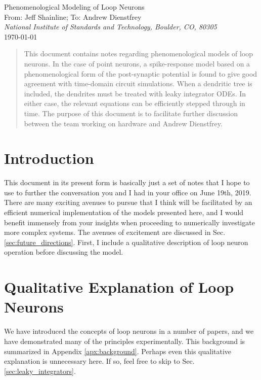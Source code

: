 \documentclass[]{article}
\begin{document}
    
\begin{center}
\LARGE{Phenomenological Modeling of Loop Neurons}\\ 
\vspace{0.3em}
\large From: Jeff Shainline; To: Andrew Dienstfrey\\
\vspace{0.0em}
\textit{\small National Institute of Standards and Technology, Boulder, CO, 80305}\\
\vspace{0.3em}
\small \today

\begin{abstract}
This document contains notes regarding phenomenological models of loop neurons. In the case of point neurons, a spike-response model based on a phenomenological form of the post-synaptic potential is found to give good agreement with time-domain circuit simulations. When a dendritic tree is included, the dendrites must be treated with leaky integrator ODEs. In either case, the relevant equations can be efficiently stepped through in time. The purpose of this document is to facilitate further discussion between the team working on hardware and Andrew Dienstfrey.
\vspace{1em}
\end{abstract}

\end{center}



\section{\label{sec:introduction}Introduction}
This document in its present form is basically just a set of notes that I hope to use to further the conversation you and I had in your office on June 19th, 2019. There are many exciting avenues to pursue that I think will be facilitated by an efficient numerical implementation of the models presented here, and I would benefit immensely from your insights when proceeding to numerically investigate more complex systems. The avenues of excitement are discussed in Sec.\,\ref{sec:future_directions}. First, I include a qualitative description of loop neuron operation before discussing the model.

\section{\label{sec:qualitative_explanation_of_loop_neurons}Qualitative Explanation of Loop Neurons}
We have introduced the concepts of loop neurons in a number of papers, and we have demonstrated many of the principles experimentally. This background is summarized in Appendix \ref{apx:background}. Perhaps even this qualitative explanation is unnecessary here. If so, feel free to skip to Sec.\,\ref{sec:leaky_integrators}.
\end{document}
